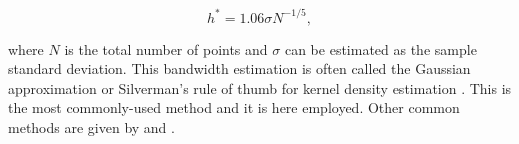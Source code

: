 \documentclass[]{book}
\theoremstyle{definition}
\theoremstyle{definition}
\theoremstyle{definition}
\theoremstyle{remark}
\begin{document}
\begin{equation*}
h^* = 1.06\sigma N^{-1/5},
\end{equation*}

where \(N\) is the total number of points and \(\sigma\) can be
estimated as the sample standard deviation. This bandwidth estimation is
often called the Gaussian approximation or Silverman's rule of thumb for
kernel density estimation \citep{silverman}. This is the most
commonly-used method and it is here employed. Other common methods are
given by \citep{sheather1991reliable} and \citep{scott1992multivariate}.


\end{document}
